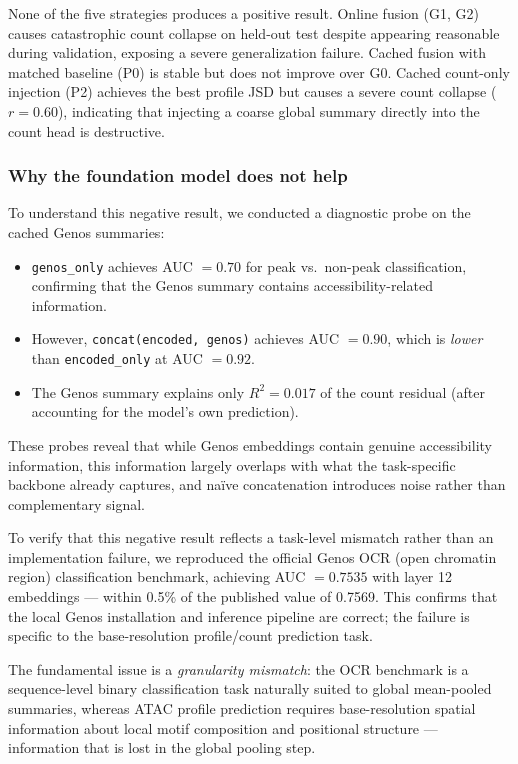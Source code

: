 \documentclass[11pt,a4paper]{article}
\begin{document}
\noindent None of the five strategies produces a positive result.
Online fusion (G1, G2) causes catastrophic count collapse on held-out
test despite appearing reasonable during validation, exposing a
severe generalization failure. Cached fusion with matched baseline (P0)
is stable but does not improve over G0. Cached count-only injection (P2)
achieves the best profile JSD but causes a severe count collapse
($r = 0.60$), indicating that injecting a coarse global summary directly
into the count head is destructive.

\subsubsection{Why the foundation model does not help}

To understand this negative result, we conducted a diagnostic probe
on the cached Genos summaries:

\begin{itemize}[leftmargin=2em]
  \item \texttt{genos\_only} achieves AUC $= 0.70$ for peak vs.\ non-peak
  classification, confirming that the Genos summary contains accessibility-related
  information.
  \item However, \texttt{concat(encoded, genos)} achieves AUC $= 0.90$,
  which is \emph{lower} than \texttt{encoded\_only} at AUC $= 0.92$.
  \item The Genos summary explains only $R^2 = 0.017$ of the count
  residual (after accounting for the model's own prediction).
\end{itemize}

\noindent These probes reveal that while Genos embeddings contain
genuine accessibility information, this information largely overlaps
with what the task-specific backbone already captures, and na\"ive
concatenation introduces noise rather than complementary signal.

To verify that this negative result reflects a task-level mismatch
rather than an implementation failure, we reproduced the official Genos
OCR (open chromatin region) classification benchmark, achieving
AUC $= 0.7535$ with layer 12 embeddings --- within 0.5\% of the
published value of 0.7569. This confirms that the local Genos
installation and inference pipeline are correct; the failure is specific
to the base-resolution profile/count prediction task.

The fundamental issue is a \emph{granularity mismatch}: the OCR
benchmark is a sequence-level binary classification task naturally suited
to global mean-pooled summaries, whereas ATAC profile prediction requires
base-resolution spatial information about local motif composition and
positional structure --- information that is lost in the global pooling
step.
\end{document}
